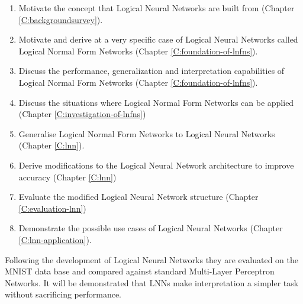 \begin{enumerate}
	\item Motivate the concept that Logical Neural Networks are built from (Chapter \ref{C:backgroundsurvey}).
	\item Motivate and derive at a very specific case of Logical Neural Networks called Logical Normal Form Networks (Chapter \ref{C:foundation-of-lnfns}).
	\item Discuss the performance, generalization and interpretation capabilities of Logical Normal Form Networks (Chapter \ref{C:foundation-of-lnfns}).
	\item Discuss the situations where Logical Normal Form Networks can be applied (Chapter \ref{C:investigation-of-lnfns})
	\item Generalise Logical Normal Form Networks to Logical Neural Networks (Chapter \ref{C:lnn}).
	\item Derive modifications to the Logical Neural Network architecture to improve accuracy (Chapter \ref{C:lnn})
	\item Evaluate the modified Logical Neural Network structure (Chapter \ref{C:evaluation-lnn})
	\item Demonstrate the possible use cases of Logical Neural Networks (Chapter \ref{C:lnn-application}).
\end{enumerate}

Following the development of Logical Neural Networks they are evaluated on the MNIST data base and compared against standard Multi-Layer Perceptron Networks. It will be demonstrated that LNNs make interpretation a simpler task without sacrificing performance.